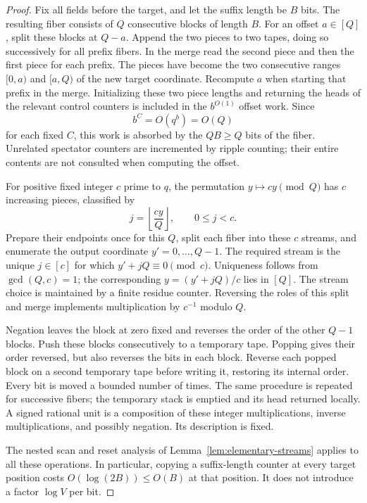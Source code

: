 \documentclass[11pt]{article}
\theoremstyle{definition}
\begin{document}
\begin{proof}
Fix all fields before the target, and let the suffix length be $B$ bits.
The resulting fiber consists of $Q$ consecutive blocks of length $B$.
For an offset $a\in[Q]$, split these blocks at $Q-a$.  Append the two
pieces to two tapes, doing so successively for all prefix fibers.  In the
merge read the second piece and then the first piece for each prefix.
The pieces have become the two consecutive ranges $[0,a)$ and $[a,Q)$
of the new target coordinate.  Recompute $a$ when starting that prefix in
the merge.  Initializing these two piece lengths and returning the heads
of the relevant control counters is included in the $b^{O(1)}$ offset
work.  Since
\[
 b^C=O(q^b)=O(Q)
\]
for each fixed $C$, this work is absorbed by the $QB\ge Q$ bits of the
fiber.  Unrelated spectator counters are incremented by ripple counting;
their entire contents are not consulted when computing the offset.

For positive fixed integer $c$ prime to $q$, the permutation
$y\mapsto cy\pmod Q$ has $c$ increasing pieces, classified by
\[
 j=\left\lfloor\frac{cy}{Q}\right\rfloor,
 \qquad 0\le j<c.
\]
Prepare their endpoints once for this $Q$, split each fiber into these
$c$ streams, and enumerate the output coordinate $y'=0,\ldots,Q-1$.
The required stream is the unique $j\in[c]$ for which
$y'+jQ\equiv0\pmod c$.  Uniqueness follows from $\gcd(Q,c)=1$;
the corresponding $y=(y'+jQ)/c$ lies in $[Q]$.  The stream choice is
maintained by a finite residue counter.  Reversing the roles of this
split and merge implements multiplication by $c^{-1}$ modulo $Q$.

Negation leaves the block at zero fixed and reverses the order of the
other $Q-1$ blocks.  Push these blocks consecutively to a temporary tape.
Popping gives their order reversed, but also reverses the bits in each
block.  Reverse each popped block on a second temporary tape before
writing it, restoring its internal order.  Every bit is moved a bounded
number of times.  The same procedure is repeated for successive fibers;
the temporary stack is emptied and its head returned locally.  A signed
rational unit is a composition of these integer multiplications, inverse
multiplications, and possibly negation.  Its description is fixed.

The nested scan and reset analysis of
Lemma~\ref{lem:elementary-streams} applies to all these operations.  In
particular, copying a suffix-length counter at every target position
costs $O(\log(2B))\le O(B)$ at that position.  It does not introduce a
factor $\log V$ per bit.
\end{proof}
\end{document}
